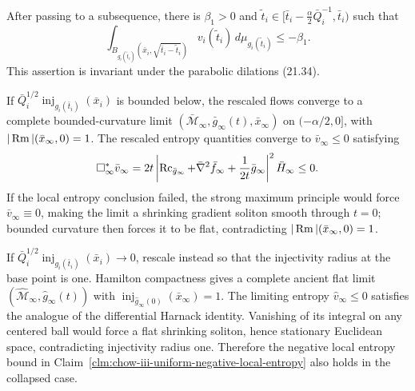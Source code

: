 \begin{theorem}
\label{clm:chow-iii-uniform-negative-local-entropy}
After passing to a subsequence, there is \(\beta_1>0\) and
\(\widetilde t_i\in[\bar t_i-\frac\alpha2\bar Q_i^{-1},\bar t_i)\) such that
\[
\int_{B_{g_i(\widetilde t_i)}(\bar x_i,\sqrt{\bar t_i-\widetilde t_i})}
v_i(\widetilde t_i)\,d\mu_{g_i(\widetilde t_i)}\le-\beta_1.
\]
This assertion is invariant under the parabolic dilations (21.34).
\end{theorem}

\begin{lemma}
\label{lem:chow-iii-noncollapsed-entropy-limit}
If \(\bar Q_i^{1/2}\operatorname{inj}_{g_i(\bar t_i)}(\bar x_i)\) is bounded below, the
rescaled flows converge to a complete bounded-curvature limit
\((\bar{\mathcal M}_\infty,\bar g_\infty(t),\bar x_\infty)\) on
\((-\alpha/2,0]\), with \(|\operatorname{Rm}|(\bar x_\infty,0)=1\).  The rescaled entropy
quantities converge to \(\bar v_\infty\le0\) satisfying
\[
\Box_\infty^*\bar v_\infty
 =2t\left|\operatorname{Rc}_{\bar g_\infty}+\bar\nabla^2\bar f_\infty+\frac1{2t}\bar g_\infty\right|^2\bar H_\infty\le0.
\]
If the local entropy conclusion failed, the strong maximum principle would
force \(\bar v_\infty\equiv0\), making the limit a shrinking gradient soliton
smooth through \(t=0\); bounded curvature then forces it to be flat, contradicting
\(|\operatorname{Rm}|(\bar x_\infty,0)=1\).
\end{lemma}

\begin{lemma}
\label{lem:chow-iii-collapsed-entropy-limit}
If \(\bar Q_i^{1/2}\operatorname{inj}_{g_i(\bar t_i)}(\bar x_i)\to0\), rescale instead so that
the injectivity radius at the base point is one.  Hamilton compactness gives a
complete ancient flat limit \((\widehat{\mathcal M}_\infty,\widehat g_\infty(t))\)
with \(\operatorname{inj}_{\widehat g_\infty(0)}(\bar x_\infty)=1\).  The limiting entropy
\(\widehat v_\infty\le0\) satisfies the analogue of the differential Harnack
identity.  Vanishing of its integral on any centered ball would force a flat
shrinking soliton, hence stationary Euclidean space, contradicting injectivity
radius one.  Therefore the negative local entropy bound in Claim~\ref{clm:chow-iii-uniform-negative-local-entropy} also holds in the collapsed case.
\end{lemma}

